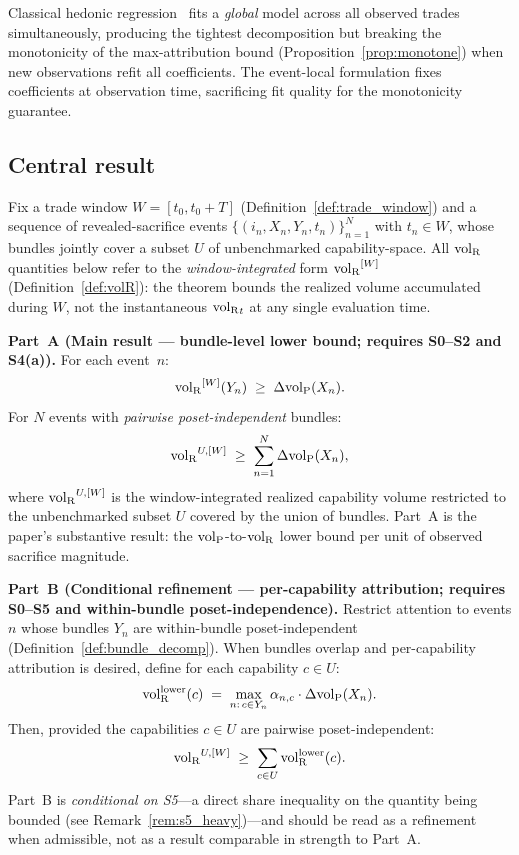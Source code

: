 \begin{remark}
Classical hedonic regression~\citep{rosen1974hedonic} fits a
\emph{global} model across all observed trades simultaneously,
producing the tightest decomposition but breaking the monotonicity
of the max-attribution bound
(Proposition~\ref{prop:monotone}) when new observations refit all
coefficients.  The event-local formulation fixes coefficients at
observation time, sacrificing fit quality for the monotonicity
guarantee.
\end{remark}

\subsection{Central result}

\begin{theorem}
\label{thm:aggregate_bound}
Fix a trade window $W = [t_0, t_0 + T]$
(Definition~\ref{def:trade_window}) and a sequence of
revealed-sacrifice events
$\{(i_n, X_n, Y_n, t_n)\}_{n=1}^N$ with $t_n \in W$, whose
bundles jointly cover a subset $U$ of unbenchmarked
capability-space.  All ${\operatorname{vol}_{\mathrm{R}}}$ quantities below refer to the
\emph{window-integrated} form ${\operatorname{vol}_{\mathrm{R}}}^{[W]}$
(Definition~\ref{def:volR}): the theorem bounds the realized
volume accumulated during $W$, not the instantaneous
${\operatorname{vol}_{\mathrm{R}}}_t$ at any single evaluation time.

\medskip\noindent
\textbf{Part~A (Main result --- bundle-level lower bound;
requires S0--S2 and S4(a)).}
For each event~$n$:
\[
  {\operatorname{vol}_{\mathrm{R}}}^{[W]}(Y_n) \;\geq\; \Delta{\operatorname{vol}_{\mathrm{P}}}(X_n).
\]
For $N$ events with \emph{pairwise poset-independent} bundles:
\[
  {\operatorname{vol}_{\mathrm{R}}}^{U,[W]} \;\geq\; \sum_{n=1}^{N} \Delta{\operatorname{vol}_{\mathrm{P}}}(X_n),
\]
where ${\operatorname{vol}_{\mathrm{R}}}^{U,[W]}$ is the window-integrated realized
capability volume restricted to the unbenchmarked subset $U$
covered by the union of bundles.  Part~A is the paper's
substantive result: the ${\operatorname{vol}_{\mathrm{P}}}$-to-${\operatorname{vol}_{\mathrm{R}}}$ lower bound per unit
of observed sacrifice magnitude.

\medskip\noindent
\textbf{Part~B (Conditional refinement --- per-capability
attribution; requires S0--S5 and within-bundle
poset-independence).}
Restrict attention to events $n$ whose bundles $Y_n$ are
within-bundle poset-independent
(Definition~\ref{def:bundle_decomp}).  When bundles overlap and
per-capability attribution is desired, define for each capability
$c \in U$:
\[
  {\operatorname{vol}_{\mathrm{R}}^{\mathrm{lower}}}(c) \;=\; \max_{n:\, c \in Y_n}
  \alpha_{n,c} \cdot \Delta{\operatorname{vol}_{\mathrm{P}}}(X_n).
\]
Then, provided the capabilities $c \in U$ are pairwise
poset-independent:
\[
  {\operatorname{vol}_{\mathrm{R}}}^{U,[W]} \;\geq\; \sum_{c \in U} {\operatorname{vol}_{\mathrm{R}}^{\mathrm{lower}}}(c).
\]
Part~B is \emph{conditional on S5}---a direct share inequality
on the quantity being bounded (see
Remark~\ref{rem:s5_heavy})---and should be read as a refinement
when admissible, not as a result comparable in strength to
Part~A.
\end{theorem}

